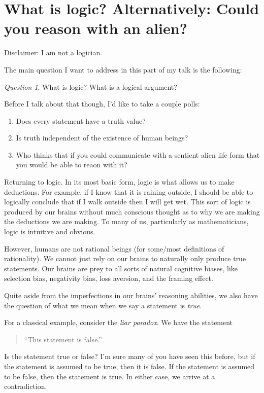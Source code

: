 \documentclass{article}
\theoremstyle{remark}
\newtheorem{question}{Question}
\begin{document}
\section{What is logic? Alternatively: Could you reason with an alien?}

Disclaimer: I am not a logician.

The main question I want to address
in this part of my talk is the following:
\begin{question}
    What is logic?
    What is a logical argument?
\end{question}

Before I talk about that though, 
I'd like to take a couple polls:
\begin{enumerate}
    \item Does every statement have a truth value?
    \item Is truth independent of the existence of 
        human beings?
    \item Who thinks that if you could communicate with a
        sentient alien life form that you would be able to reaon 
        with it?
\end{enumerate}

Returning to logic.
In its most basic form, logic is what allows us to make deductions.
For example, if I know that it is raining outside,
I should be able 
to logically conclude that if I walk outside
then I will get wet. This sort of logic is produced by our 
brains without much conscious thought as to why 
we are making the deductions we are making.
To many of us, particularly as mathematicians, 
logic is intuitive and obvious.

However, humans are not rational beings (for some/most
definitions
of rationality). We cannot just rely on our brains to 
naturally only produce true statements. Our brains are 
prey to all sorts of natural cognitive biases, like
selection bias, negativity bias, loss aversion,
and the framing effect.

Quite aside from the imperfections in our brains'
reasoning abilities, we also have the question of 
what we mean when we say a statement is \emph{true}.

For a classical example, 
consider the \emph{liar paradox}.
We have the statement
\begin{quote}
    ``This statement is false.''
\end{quote}
Is the statement true or false?
I'm sure many of you have seen this before, but 
if the statement is assumed to be true,
then it is false. If the statement is assumed 
to be false, then the statement is true.
In either case, we arrive at a contradiction.
\end{document}

